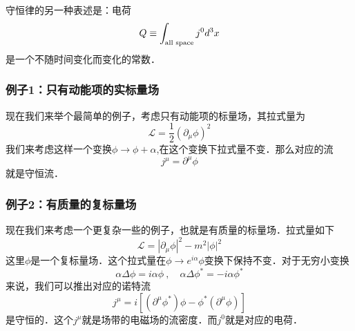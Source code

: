 守恒律的另一种表述是：电荷
\begin{equation}
Q \equiv \int_{\rm all\,\, space} j^0 d^3 x
\end{equation}
是一个不随时间变化而变化的常数．
\subsubsection{例子1：只有动能项的实标量场}
现在我们来举个最简单的例子，考虑只有动能项的标量场，其拉式量为
\begin{equation}
\mathcal L = \frac{1}{2} (\partial_\mu \phi)^2
\end{equation}
我们来考虑这样一个变换$\phi \rightarrow \phi + \alpha $,在这个变换下拉式量不变．那么对应的流
\begin{equation}
j^\mu = \partial^\mu \phi
\end{equation}
就是守恒流．
\subsubsection{例子2：有质量的复标量场}
现在我们来考虑一个更复杂一些的例子，也就是有质量的标量场．拉式量如下
\begin{equation}
\mathcal L = |\partial_\mu\phi|^2 - m^2 |\phi|^2
\end{equation}
这里$\phi$是一个复标量场．这个拉式量在$\phi\rightarrow e^{i\alpha}\phi$变换下保持不变．对于无穷小变换
\begin{equation}
\alpha \Delta \phi = i \alpha \phi~,\quad \alpha \Delta \phi^* = -i\alpha \phi^*
\end{equation}
来说，我们可以推出对应的诺特流
\begin{equation}
j^\mu = i[(\partial^\mu \phi^*)\phi-\phi^*(\partial^\mu \phi)]
\end{equation}
是守恒的．这个$j^\mu$就是场带的电磁场的流密度．而$j^0$就是对应的电荷．

